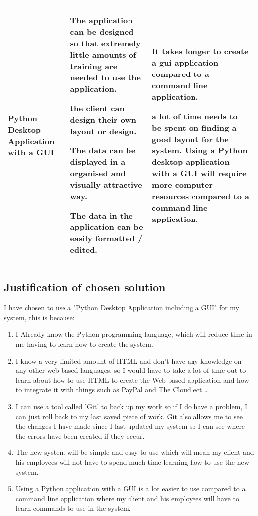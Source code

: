 \begin{center}
\begin{tabular}{|p{4cm}|p{4cm}|p{4cm}|}
{Python Desktop Application with a GUI} & {The application can be designed so that extremely little amounts of training are needed to use the application.\par the client can design their own layout or design.\par The data can be displayed in a organised and visually attractive way.\par The data in the application can be easily formatted / edited.} & {It takes longer to create a gui application compared to a command line application.\par a lot of time needs to be spent on finding a good layout for the system. Using a Python desktop application with a GUI will require more computer resources compared to a command line application.} \\ \hline
\end{tabular}
\label{tab:range_examples}
\end{center}

\subsection{Justification of chosen solution}

\begin{flushleft}
I have chosen to use a "Python Desktop Application including a GUI" for my system, this is because:\par
\end{flushleft}

\begin{enumerate}
\item I Already know the Python programming language, which will reduce time in me having to learn how to create the system.
\item I know a very limited amount of HTML and don't have any knowledge on any other web based languages, so I would have to take a lot of time out to learn about how to use HTML to create the Web based application and how to integrate it with things such as PayPal and The Cloud ect \ldots
\item I can use a tool called 'Git' to back up my work so if I do have a problem, I can just roll back to my last saved piece of work. Git also allows me to see the changes I have made since I last updated my system so I can see where the errors have been created if they occur.
\item The new system will be simple and easy to use which will mean my client and his employees will not have to spend much time learning how to use the new system.
\item Using a Python application with a GUI is a lot easier to use compared to a command line application where my client and his employees will have to learn commands to use in the system.
\end{enumerate}
